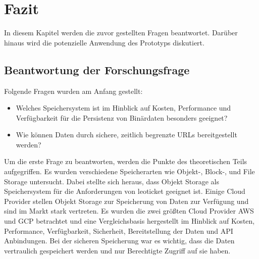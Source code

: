 \chapter{Fazit}

In diesem Kapitel werden die zuvor gestellten Fragen beantwortet. Darüber hinaus wird die potenzielle Anwendung des Prototyps diskutiert.

\section{Beantwortung der Forschungsfrage}

Folgende Fragen wurden am Anfang gestellt:

\begin{itemize}
	\item Welches Speichersystem ist im Hinblick auf Kosten, Performance und Verfügbarkeit für die Persistenz von Binärdaten besonders geeignet? 
	\item Wie können Daten durch sichere, zeitlich begrenzte URLs bereitgestellt werden?
\end{itemize}

Um die erste Frage zu beantworten, werden die Punkte des theoretischen Teils aufgegriffen. Es wurden verschiedene Speicherarten wie Objekt-, Block-, und File Storage untersucht. Dabei stellte sich heraus, dass Objekt Storage als Speichersystem für die Anforderungen von leoticket geeignet ist. Einige Cloud Provider stellen Objekt Storage zur Speicherung von Daten zur Verfügung und sind im Markt stark vertreten. Es wurden die zwei größten Cloud Provider AWS und GCP betrachtet und eine Vergleichsbasis hergestellt im Hinblick auf Kosten, Performance, Verfügbarkeit, Sicherheit, Bereitstellung der Daten und API Anbindungen. Bei der sicheren Speicherung war es wichtig, dass die Daten vertraulich gespeichert werden und nur Berechtigte Zugriff auf sie haben.\\

